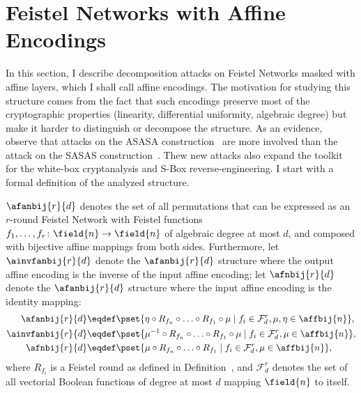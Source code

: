\section{Feistel Networks with Affine Encodings}

In this section, I describe decomposition attacks on Feistel Networks masked with affine layers, which I shall call affine encodings. The motivation for studying this structure comes from the fact that such encodings preserve most of the cryptographic properties (linearity, differential uniformity, algebraic degree) but make it harder to distinguish or decompose the structure. As an evidence, observe that attacks on the ASASA construction~\cite{ASASA1,ASASA2} are more involved than the attack on the SASAS construction~\cite{SASAS}.
Thew new attacks also expand the toolkit for the white-box cryptanalysis and S-Box reverse-engineering. I start with a formal definition of the analyzed structure.

\newcommand\FF{\mathcal{F}^r_d}
\begin{definition}
    $\afanbij{r}{d}$ denotes the set of all permutations that can be expressed as an $r$-round Feistel Network with Feistel functions $f_1,\ldots,f_r\colon \field{n} \to \field{n}$ of algebraic degree at most $d$, and composed with bijective affine mappings from both sides. Furthermore, let $\ainvfanbij{r}{d}$ denote the $\afanbij{r}{d}$ structure where the output affine encoding is the inverse of the input affine encoding; let $\afnbij{r}{d}$ denote the $\afanbij{r}{d}$ structure where the input affine encoding is the identity mapping:
    \begin{align*}
        \afanbij{r}{d} &\eqdef \pset{\eta \circ R_{f_n}\circ\ldots\circ R_{f_1} \circ \mu \mid f_i \in \FF,
        \mu,\eta \in \affbij{n}
        },\\
        \ainvfanbij{r}{d} &\eqdef \pset{\mu^{-1} \circ R_{f_n}\circ\ldots\circ R_{f_1} \circ \mu \mid f_i \in \FF,
        \mu \in \affbij{n}
        },\\
        \afnbij{r}{d} &\eqdef \pset{\mu \circ R_{f_n}\circ\ldots\circ R_{f_1} \mid f_i \in \FF,
        \mu \in \affbij{n}
        },
    \end{align*}
    where $R_{f_i}$ is a Feistel round as defined in Definition~, and $\FF$ denotes the set of all vectorial Boolean functions of degree at most $d$ mapping $\field{n}$ to itself.
\end{definition}

